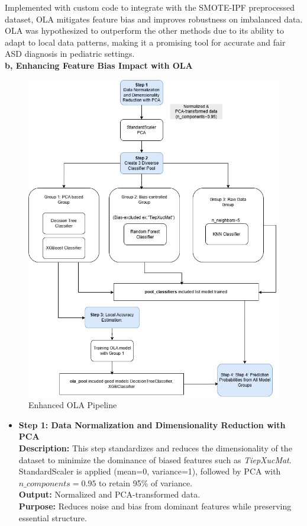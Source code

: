\documentclass[conference]{IEEEtran}
\begin{document}
\begin{enumerate}
Implemented with custom code to integrate with the SMOTE-IPF preprocessed dataset, OLA mitigates feature bias and improves robustness on imbalanced data. OLA was hypothesized to outperform the other methods due to its ability to adapt to local data patterns, making it a promising tool for accurate and fair ASD diagnosis in pediatric settings.\\
\textbf{b, Enhancing Feature Bias Impact with OLA}
\begin{figure}[H]
    \centering
    \includegraphics[width=0.95\linewidth]{images/structure_imp_ola.png} 
    \caption{Enhanced OLA Pipeline}
    \label{fig:ola_pipeline}
\end{figure}
\begin{itemize}
\item \textbf{Step 1: Data Normalization and Dimensionality Reduction with PCA}~\\
\textbf{Description:} This step standardizes and reduces the dimensionality of the dataset to minimize the dominance of biased features such as \textit{TiepXucMat}. StandardScaler is applied (mean=0, variance=1), followed by PCA with $n\_components=0.95$ to retain 95\% of variance.\\
\textbf{Output:} Normalized and PCA-transformed data.\\
\textbf{Purpose:} Reduces noise and bias from dominant features while preserving essential structure.


\end{itemize}
\end{enumerate}
\end{document}
